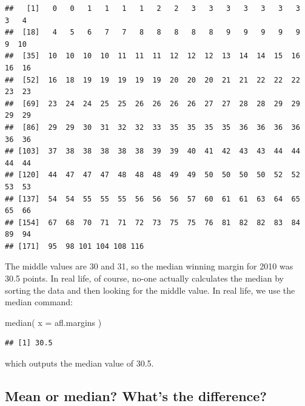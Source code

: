 \documentclass[
]{book}
\newenvironment{Shaded}{\begin{snugshade}}{\end{snugshade}}
\newcommand{\AttributeTok}[1]{\textcolor[rgb]{0.77,0.63,0.00}{#1}}
\newcommand{\FunctionTok}[1]{\textcolor[rgb]{0.00,0.00,0.00}{#1}}
\newcommand{\NormalTok}[1]{#1}
\begin{document}
\begin{verbatim}
##   [1]   0   0   1   1   1   1   2   2   3   3   3   3   3   3   3   3   4
##  [18]   4   5   6   7   7   8   8   8   8   8   9   9   9   9   9   9  10
##  [35]  10  10  10  10  11  11  11  12  12  12  13  14  14  15  16  16  16
##  [52]  16  18  19  19  19  19  19  20  20  20  21  21  22  22  22  23  23
##  [69]  23  24  24  25  25  26  26  26  26  27  27  28  28  29  29  29  29
##  [86]  29  29  30  31  32  32  33  35  35  35  35  36  36  36  36  36  36
## [103]  37  38  38  38  38  38  39  39  40  41  42  43  43  44  44  44  44
## [120]  44  47  47  47  48  48  48  49  49  50  50  50  50  52  52  53  53
## [137]  54  54  55  55  55  56  56  56  57  60  61  61  63  64  65  65  66
## [154]  67  68  70  71  71  72  73  75  75  76  81  82  82  83  84  89  94
## [171]  95  98 101 104 108 116
\end{verbatim}

The middle values are 30 and 31, so the median winning margin for 2010 was 30.5 points. In real life, of course, no-one actually calculates the median by sorting the data and then looking for the middle value. In real life, we use the median command:

\begin{Shaded}
\begin{Highlighting}[]
\FunctionTok{median}\NormalTok{( }\AttributeTok{x =}\NormalTok{ afl.margins )}
\end{Highlighting}
\end{Shaded}

\begin{verbatim}
## [1] 30.5
\end{verbatim}

which outputs the median value of 30.5.

\hypertarget{mean-or-median-whats-the-difference}{%
\subsection{Mean or median? What's the difference?}\label{mean-or-median-whats-the-difference}}
\end{document}

